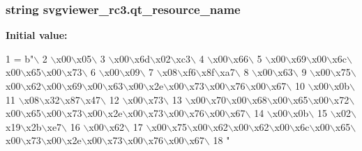 \subsubsection[{qt\+\_\+resource\+\_\+name}]{\setlength{\rightskip}{0pt plus 5cm}string svgviewer\+\_\+rc3.\+qt\+\_\+resource\+\_\+name}\label{namespacesvgviewer__rc3_a1d61f6d996ef81000933ca465c90ad61}
{\bfseries Initial value\+:}
\begin{DoxyCode}
1 = b\textcolor{stringliteral}{"\(\backslash\)}
2 \textcolor{stringliteral}{\(\backslash\)x00\(\backslash\)x05\(\backslash\)}
3 \textcolor{stringliteral}{\(\backslash\)x00\(\backslash\)x6d\(\backslash\)x02\(\backslash\)xc3\(\backslash\)}
4 \textcolor{stringliteral}{\(\backslash\)x00\(\backslash\)x66\(\backslash\)}
5 \textcolor{stringliteral}{\(\backslash\)x00\(\backslash\)x69\(\backslash\)x00\(\backslash\)x6c\(\backslash\)x00\(\backslash\)x65\(\backslash\)x00\(\backslash\)x73\(\backslash\)}
6 \textcolor{stringliteral}{\(\backslash\)x00\(\backslash\)x09\(\backslash\)}
7 \textcolor{stringliteral}{\(\backslash\)x08\(\backslash\)xf6\(\backslash\)x8f\(\backslash\)xa7\(\backslash\)}
8 \textcolor{stringliteral}{\(\backslash\)x00\(\backslash\)x63\(\backslash\)}
9 \textcolor{stringliteral}{\(\backslash\)x00\(\backslash\)x75\(\backslash\)x00\(\backslash\)x62\(\backslash\)x00\(\backslash\)x69\(\backslash\)x00\(\backslash\)x63\(\backslash\)x00\(\backslash\)x2e\(\backslash\)x00\(\backslash\)x73\(\backslash\)x00\(\backslash\)x76\(\backslash\)x00\(\backslash\)x67\(\backslash\)}
10 \textcolor{stringliteral}{\(\backslash\)x00\(\backslash\)x0b\(\backslash\)}
11 \textcolor{stringliteral}{\(\backslash\)x08\(\backslash\)x32\(\backslash\)x87\(\backslash\)x47\(\backslash\)}
12 \textcolor{stringliteral}{\(\backslash\)x00\(\backslash\)x73\(\backslash\)}
13 \textcolor{stringliteral}{\(\backslash\)x00\(\backslash\)x70\(\backslash\)x00\(\backslash\)x68\(\backslash\)x00\(\backslash\)x65\(\backslash\)x00\(\backslash\)x72\(\backslash\)x00\(\backslash\)x65\(\backslash\)x00\(\backslash\)x73\(\backslash\)x00\(\backslash\)x2e\(\backslash\)x00\(\backslash\)x73\(\backslash\)x00\(\backslash\)x76\(\backslash\)x00\(\backslash\)x67\(\backslash\)}
14 \textcolor{stringliteral}{\(\backslash\)x00\(\backslash\)x0b\(\backslash\)}
15 \textcolor{stringliteral}{\(\backslash\)x02\(\backslash\)x19\(\backslash\)x2b\(\backslash\)xe7\(\backslash\)}
16 \textcolor{stringliteral}{\(\backslash\)x00\(\backslash\)x62\(\backslash\)}
17 \textcolor{stringliteral}{\(\backslash\)x00\(\backslash\)x75\(\backslash\)x00\(\backslash\)x62\(\backslash\)x00\(\backslash\)x62\(\backslash\)x00\(\backslash\)x6c\(\backslash\)x00\(\backslash\)x65\(\backslash\)x00\(\backslash\)x73\(\backslash\)x00\(\backslash\)x2e\(\backslash\)x00\(\backslash\)x73\(\backslash\)x00\(\backslash\)x76\(\backslash\)x00\(\backslash\)x67\(\backslash\)}
18 \textcolor{stringliteral}{"}
\end{DoxyCode}
\hypertarget{namespacesvgviewer__rc3_a929bc57dcf6e9428fea3fe0a2c2f80fd}{}
